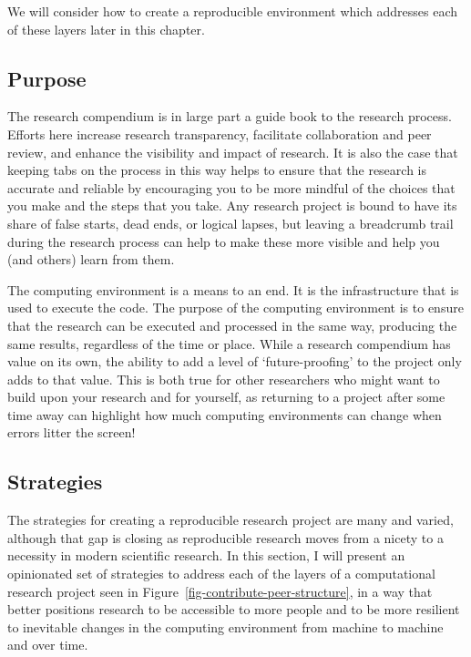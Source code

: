 \documentclass[
  letterpaper,
  krantz1]{latex/krantz-mod}
\theoremstyle{definition}
\theoremstyle{definition}
\theoremstyle{remark}
\begin{document}
We will consider how to create a reproducible environment which
addresses each of these layers later in this chapter.

\subsection{Purpose}\label{sec-contribute-peer-purpose}

The research compendium is in large part a
guide book to the research process. Efforts here increase research
transparency, facilitate collaboration and peer review, and enhance the
visibility and impact of research. It is also the case that keeping tabs
on the process in this way helps to ensure that the research is accurate
and reliable by encouraging you to be more mindful of the choices that
you make and the steps that you take. Any research project is bound to
have its share of false starts, dead ends, or logical lapses, but
leaving a breadcrumb trail during the research process can help to make
these more visible and help you (and others) learn from them.

The computing environment is a means to an
end. It is the infrastructure that is used to execute the code. The
purpose of the computing environment is to ensure that the research can
be executed and processed in the same way, producing the same results,
regardless of the time or place. While a research compendium has value
on its own, the ability to add a level of `future-proofing' to the
project only adds to that value. This is both true for other researchers
who might want to build upon your research and for yourself, as
returning to a project after some time away can highlight how much
computing environments can change when errors litter the screen!

\subsection{Strategies}\label{sec-contribute-peer-strategies}

The strategies for creating a reproducible
research project are many and varied,
although that gap is closing as reproducible research moves from a
nicety to a necessity in modern scientific
research. In this section, I will
present an opinionated set of strategies to address each of the layers
of a computational research project seen in
Figure~\ref{fig-contribute-peer-structure}, in a way that better
positions research to be accessible to more people and to be more
resilient to inevitable changes in the computing environment from
machine to machine and over time.
\end{document}
